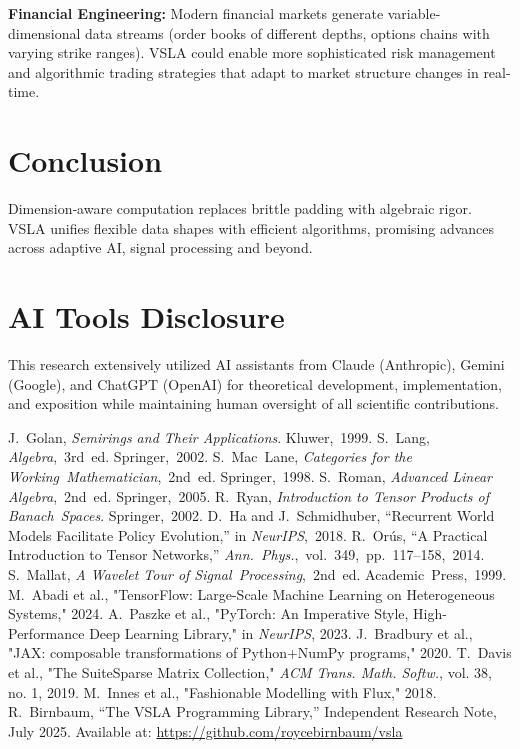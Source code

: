 \documentclass[11pt]{article}
\begin{document}
\textbf{Financial Engineering:} Modern financial markets generate variable-dimensional data streams (order books of different depths, options chains with varying strike ranges). VSLA could enable more sophisticated risk management and algorithmic trading strategies that adapt to market structure changes in real-time.

\clearpage
\section{Conclusion}
Dimension‑aware computation replaces brittle padding with algebraic rigor.  VSLA unifies flexible data shapes with efficient algorithms, promising advances across adaptive AI, signal processing and beyond.

\section*{AI Tools Disclosure}

This research extensively utilized AI assistants from Claude (Anthropic), Gemini (Google), and ChatGPT (OpenAI) for theoretical development, implementation, and exposition while maintaining human oversight of all scientific contributions.

\begin{thebibliography}{9}
\footnotesize
{} J.~Golan, \emph{Semirings and Their Applications}. Kluwer, 1999.
 S.~Lang, \emph{Algebra}, 3rd ed. Springer, 2002.
 S.~Mac~Lane, \emph{Categories for the Working Mathematician}, 2nd ed. Springer, 1998.
 S.~Roman, \emph{Advanced Linear Algebra}, 2nd ed. Springer, 2005.
 R.~Ryan, \emph{Introduction to Tensor Products of Banach Spaces}. Springer, 2002.
 D.~Ha and J.~Schmidhuber, “Recurrent World Models Facilitate Policy Evolution,” in \emph{NeurIPS}, 2018.
 R.~Orús, “A Practical Introduction to Tensor Networks,” \emph{Ann. Phys.}, vol. 349, pp. 117–158, 2014.
 S.~Mallat, \emph{A Wavelet Tour of Signal Processing}, 2nd ed. Academic Press, 1999.
 M.~Abadi et al., "TensorFlow: Large-Scale Machine Learning on Heterogeneous Systems," 2024.
 A.~Paszke et al., "PyTorch: An Imperative Style, High-Performance Deep Learning Library," in \emph{NeurIPS}, 2023.
 J.~Bradbury et al., "JAX: composable transformations of Python+NumPy programs," 2020.
 T.~Davis et al., "The SuiteSparse Matrix Collection," \emph{ACM Trans. Math. Softw.}, vol. 38, no. 1, 2019.
 M.~Innes et al., "Fashionable Modelling with Flux," 2018.
 R.~Birnbaum, ``The VSLA Programming Library,'' Independent Research Note, July 2025. Available at: \url{https://github.com/roycebirnbaum/vsla}
\end{thebibliography}
\end{document}
